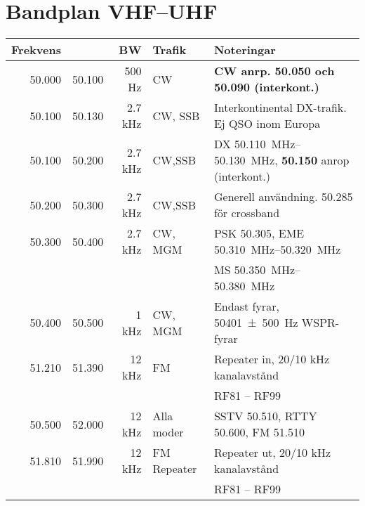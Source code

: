 \section{Bandplan VHF--UHF}

\begin{tabular}{rrrll}
\textbf{Frekvens} &        & \textbf{BW} & \textbf{Trafik}
& \textbf{Noteringar} \\ \hline

50.000 & 50.100 & 500 Hz  & CW          & \textbf{CW anrp. 50.050 och 50.090 (interkont.)}                                    \\ \hline
50.100 & 50.130 & 2.7 kHz & CW, SSB     & Interkontinental DX-trafik. Ej QSO inom Europa                                      \\ \hline
50.100 & 50.200 & 2.7 kHz & CW,SSB      &
DX \SIrange{50,110}{50,130}{\mega\hertz}, \textbf{\num{50,150}} anrop (interkont.)  \\ \hline
50.200 & 50.300 & 2.7 kHz & CW,SSB      & Generell användning. \num{50,285} för crossband                                     \\ \hline
50.300 & 50.400 & 2.7 kHz & CW, MGM     & PSK \num{50,305}, EME \SIrange{50,310}{50,320}{\mega\hertz}                         \\
       &        &         &             & MS \SIrange{50,350}{50,380}{\mega\hertz}                                            \\ \hline
50.400 & 50.500 & 1 kHz   & CW, MGM     & Endast fyrar, \SI{50401(500)}{Hz} WSPR-fyrar                                        \\ \hline
51.210 & 51.390 & 12 kHz  & FM          & Repeater in, 20/10 kHz kanalavstånd                                                 \\
       &        &         &             & RF81 – RF99                                                                         \\ \hline
50.500 & 52.000 & 12 kHz  & Alla moder  & SSTV \num{50,510}, RTTY \num{50,600}, FM \num{51,510}                               \\ \hline
51.810 & 51.990 & 12 kHz  & FM Repeater & Repeater ut, 20/10 kHz kanalavstånd                                                 \\
       &        &         &             & RF81 – RF99                                                                         \\ \hline
\end{tabular}

